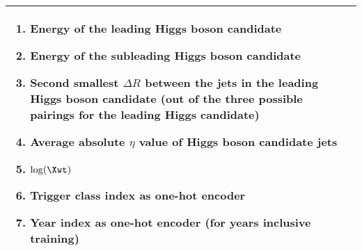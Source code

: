 \begin{table}[hbt]
\begin{tabular}{p{7cm}|p{7cm}}
\begin{enumerate}
                \item Energy of the leading Higgs boson candidate
                \item Energy of the subleading Higgs boson candidate
                \item Second smallest $\Delta R$ between the jets in the leading Higgs boson candidate (out of the three possible pairings for the leading Higgs candidate)
                \item Average absolute $\eta$ value of Higgs boson candidate jets
                \item $\log(\Xwt)$%
                \item Trigger class index as one-hot encoder
                \item Year index as one-hot encoder (for years inclusive training)
        \end{enumerate}\\
        \bottomrule
        \end{tabular}
\end{table}
